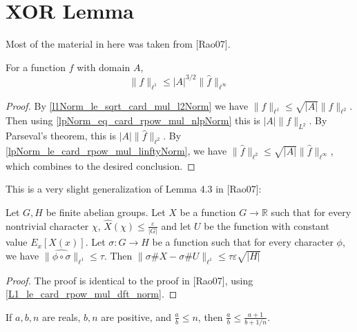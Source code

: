 \chapter{XOR Lemma}
\label{chap:xorlemma}

Most of the material in here was taken from [Rao07].

\begin{theorem}
    \label{L1_le_card_rpow_mul_dft_norm}
    \leanok
    For a function $f$ with domain $A$,
    $$\lVert f \rVert_{\ell^1} \leq |A|^{3/2} \lVert \hat f \rVert_{\ell^\infty}$$
\end{theorem}

\begin{proof}
    \leanok
    By \ref{l1Norm_le_sqrt_card_mul_l2Norm} we have $\lVert f \rVert_{\ell^1} \leq \sqrt{|A|} \lVert f \rVert_{\ell^2}$.
    Then using \ref{lpNorm_eq_card_rpow_mul_nlpNorm} this is $|A| \lVert f \rVert_{L^2}$. By Parseval's theorem,
    this is $|A| \lVert \hat f \rVert_{\ell^2}$. By \ref{lpNorm_le_card_rpow_mul_linftyNorm}, we have 
    $\lVert \hat f \rVert_{\ell^2} \leq \sqrt{|A|} \lVert \hat f \rVert_{\ell^\infty}$, which combines to the desired conclusion.
\end{proof}

\begin{lemma}
    \label{lemma43}
    \leanok
    This is a very slight generalization of Lemma 4.3 in [Rao07]:

    Let $G, H$ be finite abelian groups. Let $X$ be a function $G \to \mathbb{R}$ such that for every nontrivial character $\chi$,
    $\hat{X}(\chi) \leq \frac{\varepsilon}{|G|}$ and let $U$ be the function with constant value $E_x[X(x)]$. Let $\sigma: G \to H$ be a
    function such that for every character $\phi$, we have $\lVert \widehat{\phi \circ \sigma} \rVert_{\ell^1} \leq \tau$.
    Then $\lVert \sigma \# X - \sigma \# U \rVert_{\ell^1} \leq \tau \varepsilon \sqrt{|H|}$
\end{lemma}

\begin{proof}
    \leanok
    The proof is identical to the proof in [Rao07], using \ref{L1_le_card_rpow_mul_dft_norm}.
\end{proof}

\begin{lemma}
    \label{le_add_div_add_of_le_of_le}
    \leanok
    If $a, b, n$ are reals, $b, n$ are positive, and $\frac ab \leq n$, then $\frac ab \leq \frac{a+1}{b + 1/n}$.
\end{lemma}


